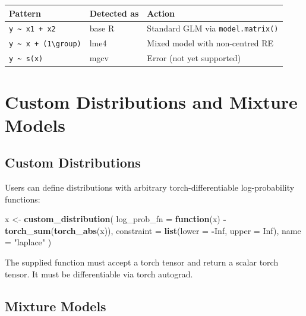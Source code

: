 \documentclass[
  11pt,
]{article}
\newenvironment{Shaded}{\begin{snugshade}}{\end{snugshade}}
\newcommand{\AttributeTok}[1]{\textcolor[rgb]{0.13,0.29,0.53}{#1}}
\newcommand{\ConstantTok}[1]{\textcolor[rgb]{0.56,0.35,0.01}{#1}}
\newcommand{\ControlFlowTok}[1]{\textcolor[rgb]{0.13,0.29,0.53}{\textbf{#1}}}
\newcommand{\FunctionTok}[1]{\textcolor[rgb]{0.13,0.29,0.53}{\textbf{#1}}}
\newcommand{\NormalTok}[1]{#1}
\newcommand{\OtherTok}[1]{\textcolor[rgb]{0.56,0.35,0.01}{#1}}
\newcommand{\SpecialCharTok}[1]{\textcolor[rgb]{0.81,0.36,0.00}{\textbf{#1}}}
\newcommand{\StringTok}[1]{\textcolor[rgb]{0.31,0.60,0.02}{#1}}
\newcounter{none} %
\begin{document}
{\def\LTcaptype{none} %
\begin{longtable}[]{@{}lll@{}}
\toprule\noalign{}
Pattern & Detected as & Action \\
\midrule\noalign{}
\endhead
\bottomrule\noalign{}
\endlastfoot
\texttt{y\ \textasciitilde{}\ x1\ +\ x2} & base R & Standard GLM via
\texttt{model.matrix()} \\
\texttt{y\ \textasciitilde{}\ x\ +\ (1\textbackslash{}\textbar{}group)}
& lme4 & Mixed model with non-centred RE \\
\texttt{y\ \textasciitilde{}\ s(x)} & mgcv & Error (not yet
supported) \\
\end{longtable}
}

\section{Custom Distributions and Mixture
Models}\label{custom-distributions-and-mixture-models}

\subsection{Custom Distributions}\label{custom-distributions}

Users can define distributions with arbitrary torch-differentiable
log-probability functions:

\begin{Shaded}
\begin{Highlighting}[]
\NormalTok{x }\OtherTok{\textless{}{-}} \FunctionTok{custom\_distribution}\NormalTok{(}
  \AttributeTok{log\_prob\_fn =} \ControlFlowTok{function}\NormalTok{(x) }\SpecialCharTok{{-}}\FunctionTok{torch\_sum}\NormalTok{(}\FunctionTok{torch\_abs}\NormalTok{(x)),}
  \AttributeTok{constraint =} \FunctionTok{list}\NormalTok{(}\AttributeTok{lower =} \SpecialCharTok{{-}}\ConstantTok{Inf}\NormalTok{, }\AttributeTok{upper =} \ConstantTok{Inf}\NormalTok{),}
  \AttributeTok{name =} \StringTok{"laplace"}
\NormalTok{)}
\end{Highlighting}
\end{Shaded}

The supplied function must accept a torch tensor and return a scalar
torch tensor. It must be differentiable via torch autograd.

\subsection{Mixture Models}\label{mixture-models}
\end{document}
